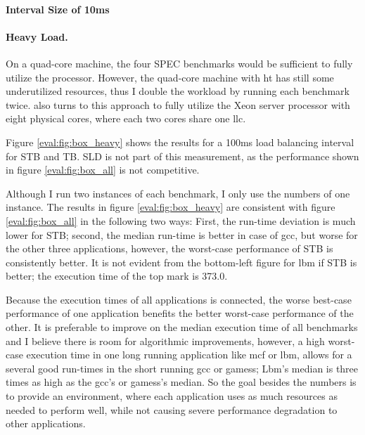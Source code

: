 \paragraph{Interval Size of 10ms}



\paragraph{Heavy Load.}
On a quad-core machine, the four SPEC benchmarks would be sufficient to fully
utilize the processor.
However, the quad-core machine with \gls{ht} has still some underutilized
resources, thus I double the workload by running each benchmark twice.
\cite{zhuravlev_addressing_2010} also turns to this approach to fully utilize
the Xeon server processor with eight physical cores, where each two cores share
one \gls{llc}.

Figure \ref{eval:fig:box_heavy} shows the results for a 100ms load balancing
interval for STB and TB. SLD is not part of this measurement, as the
performance shown in figure \ref{eval:fig:box_all} is not competitive.

Although I run two instances of each benchmark, I only use the numbers of one
instance.
The results in figure \ref{eval:fig:box_heavy} are consistent with figure
\ref{eval:fig:box_all} in the following two ways:
First, the run-time deviation is much lower for STB; second, the median
run-time is better in case of gcc, but worse for the other three applications,
however, the worst-case performance of STB is consistently better.
It is not evident from the bottom-left figure for lbm if STB is better; the
execution time of the top mark is 373.0.

Because the execution times of all applications is connected, the worse
best-case performance of one application benefits the better worst-case
performance of the other.
It is preferable to improve on the median execution time of all benchmarks and
I believe there is room for algorithmic improvements, however, a high
worst-case execution time in one long running application like mcf or lbm, allows for a
several good run-times in the short running gcc or gamess; Lbm's median is
three times as high as the gcc's or gamess's median.
So the goal besides the numbers is to provide an environment, where each
application uses as much resources as needed to perform well, while not causing
severe performance degradation to other applications.



